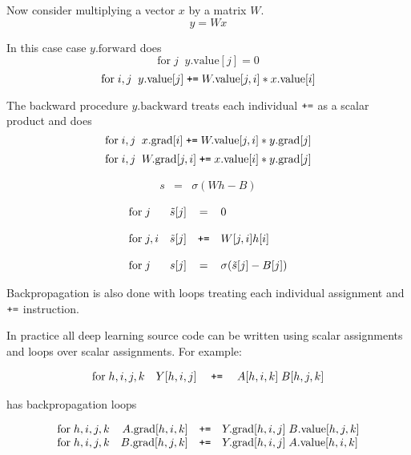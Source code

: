 {
Now consider multiplying a vector $x$ by a matrix $W$.
$$y = Wx$$

\vfill
In this case case $y.\mathrm{forward}$ does
$$\mathrm{for}\;j\;\;y.\mathrm{value}[j] = 0$$
$$\mathrm{for}\;i,j\;\;y.\mathrm{value}[j] \;\mbox{\tt +=}\;W.\mathrm{value}[j,i]*x.\mathrm{value}[i]$$

\vfill
The backward procedure $y.\mathrm{backward}$ treats each individual $\mbox{\tt +=}$ as a scalar product and does
$$\mathrm{for}\;i,j\;\;x.\mathrm{grad}[i] \;\mbox{\tt +=}\;W.\mathrm{value}[j,i]*y.\mathrm{grad}[j]$$
$$\mathrm{for}\;i,j\;\;W.\mathrm{grad}[j,i] \;\mbox{\tt +=}\;x.\mathrm{value}[i]*y.\mathrm{grad}[j]$$


\begin{eqnarray*}
   s & = & \sigma\left(Wh - B \right)
\end{eqnarray*}

$$\begin{array}{lrcl}
\mathrm{for}\;j &  \tilde{s}[j] & = & 0 \\
\\
\mathrm{for}\;j,i &  \tilde{s}[j] & \mbox{\tt +=} &  W[j,i]h[i] \\
\\
\mathrm{for}\; j & s[j] & = & \sigma(\tilde{s}[j] - B[j])
\end{array}$$

\vfill
Backpropagation is also done with loops treating each individual assignment and $\mbox{\tt +=}$ instruction.


In practice all deep learning source code can be written using scalar assignments and loops over scalar assignments.
For example:

$$\begin{array}{rrcl}
\mathrm{for}\; h,i,j,k & Y[h,i,j] & \;\mbox{\tt +=}\; & A[h,i,k]\;B[h,j,k] \\
\end{array}$$

\vfill
has backpropagation loops

$$\begin{array}{rrcl}
\mathrm{for}\;h,i,j,k & A.\mathrm{grad}[h,i,k] & \mbox{\tt +=} & Y.\mathrm{grad}[h,i,j] \;B.\mathrm{value}[h,j,k] \\
\mathrm{for}\;h,i,j,k & B.\mathrm{grad}[h,j,k] & \mbox{\tt +=} & Y.\mathrm{grad}[h,i,j]\;A.\mathrm{value}[h,i,k]
\end{array}$$

}


